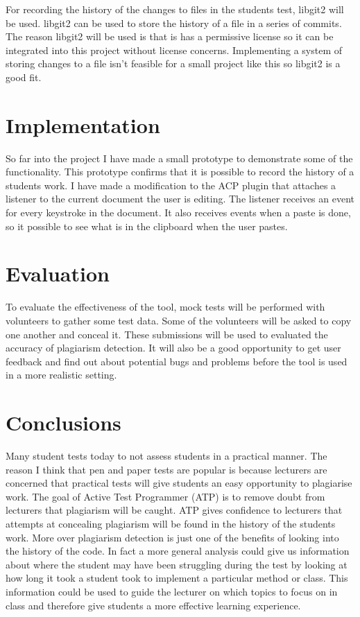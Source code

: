 \documentclass[twocolumn]{article}
\begin{document}
For recording the history of the changes to files in the students test, libgit2
will be used. libgit2 can be used to store the history of a file in a series of
commits. The reason libgit2 will be used is that is has a permissive license so
it can be integrated into this project without license concerns. Implementing
a system of storing changes to a file isn't feasible for a small project like
this so libgit2 is a good fit.


\section{Implementation}
So far into the project I have made a small prototype to demonstrate some of the
functionality. This prototype confirms that it is possible to record the history
of a students work. I have made a modification to the ACP plugin that attaches a
listener to the current document the user is editing. The listener receives an
event for every keystroke in the document. It also receives events when a paste
is done, so it possible to see what is in the clipboard when the user pastes.

\section{Evaluation}
To evaluate the effectiveness of the tool, mock tests will be performed with
volunteers to gather some test data. Some of the volunteers will be asked to
copy one another and conceal it. These submissions will be used to evaluated the
accuracy of plagiarism detection. It will also be a good opportunity to get user
feedback and find out about potential bugs and problems before the tool is used
in a more realistic setting.

\section{Conclusions}
Many student tests today to not assess students in a practical manner. The reason
I think that pen and paper tests are popular is because lecturers are concerned
that practical tests will give students an easy opportunity to plagiarise work.
The goal of Active Test Programmer (ATP) is to remove doubt from lecturers that
plagiarism will be caught. ATP gives confidence to lecturers that attempts at
concealing plagiarism will be found in the history of the students work. More
over plagiarism detection is just one of the benefits of looking into the history
of the code. In fact a more general analysis could give us information about
where the student may have been struggling during the test by looking at how
long it took a student took to implement a particular method or class. This
information could be used to guide the lecturer on which topics to focus on in
class and therefore give students a more effective learning experience.



\end{document}
